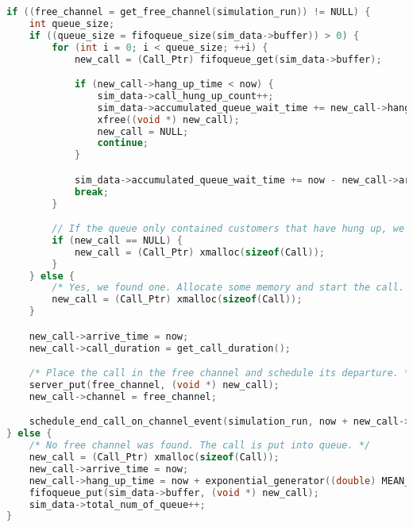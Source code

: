 \begin{lstlisting}[float,language=c,caption=Hang Up \& Connect, or Wait on Call Arrival, label=list:exp4_arrival]
if ((free_channel = get_free_channel(simulation_run)) != NULL) {
	int queue_size;
	if ((queue_size = fifoqueue_size(sim_data->buffer)) > 0) {
		for (int i = 0; i < queue_size; ++i) {
			new_call = (Call_Ptr) fifoqueue_get(sim_data->buffer);

			if (new_call->hang_up_time < now) {
				sim_data->call_hung_up_count++;
				sim_data->accumulated_queue_wait_time += new_call->hang_up_time - new_call->arrive_time;
				xfree((void *) new_call);
				new_call = NULL;
				continue;
			}

			sim_data->accumulated_queue_wait_time += now - new_call->arrive_time;
			break;
		}

		// If the queue only contained customers that have hung up, we need to allocate some memory for the new call
		if (new_call == NULL) {
			new_call = (Call_Ptr) xmalloc(sizeof(Call));
		}
	} else {
		/* Yes, we found one. Allocate some memory and start the call. */
		new_call = (Call_Ptr) xmalloc(sizeof(Call));
	}

	new_call->arrive_time = now;
	new_call->call_duration = get_call_duration();

	/* Place the call in the free channel and schedule its departure. */
	server_put(free_channel, (void *) new_call);
	new_call->channel = free_channel;

	schedule_end_call_on_channel_event(simulation_run, now + new_call->call_duration, (void *) free_channel);
} else {
	/* No free channel was found. The call is put into queue. */
	new_call = (Call_Ptr) xmalloc(sizeof(Call));
	new_call->arrive_time = now;
	new_call->hang_up_time = now + exponential_generator((double) MEAN_HANG_UP_TIME);
	fifoqueue_put(sim_data->buffer, (void *) new_call);
	sim_data->total_num_of_queue++;
}
\end{lstlisting}
	
